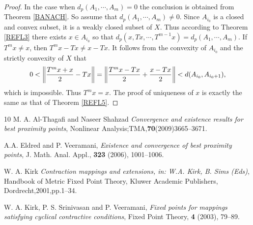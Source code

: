 \documentclass{amsart}
\theoremstyle{definition}
\theoremstyle{remark}
\begin{document}
\begin{proof}In the case when $d_p(A_1,\cdots,A_m)=0$ the conclusion is obtained from Theorem \ref{BANACH}. So assume that $d_p(A_1,\cdots,A_m)\neq0$. Since $A_{i_0}$ is a closed and convex subset, it is a weakly closed subset of $X$. Thus according to Theorem \ref{REFL3} there exists $x\in A_{i_0}$ so that $d_p(x,Tx,\cdots,T^{m-1}x)=d_p(A_1,\cdots,A_m)$. If $T^mx\neq x$, then $T^mx-Tx\neq x-Tx$. It follows from the convexity of $A_{i_0}$ and the strictly convexity of $X$ that $$0<\left\|{{{T^mx}+x}\over{2}}-Tx\right\|=\left\|{{{T^mx}-Tx}\over{2}}+{{x-Tx}\over{2}}\right\|<d(A_{i_0},A_{i_0+1}),$$ which is impossible. Thus $T^mx=x$. The proof of uniqueness of $x$ is exactly the same as that of Theorem \ref{REFL5}.
\end{proof}

\begin{thebibliography}{10}
 M. A. Al-Thagafi and Naseer Shahzad
 \textit{ Convergence and existence results for best proximity points},
Nonlinear Analysis;TMA,\textbf{70}(2009)3665--3671.


A.A. Eldred and P. Veeramani, \textit{ Existence and convergence of best proximity points}, J. Math. Anal. Appl., \textbf{323} (2006), 1001--1006.

W. A. Kirk \textit{ Contraction mappings and extensions, in: W.A. Kirk, B. Sims (Eds)}, Handbook of Metric Fixed Point Theory, Kluwer Academic Publishers, Dordrecht,2001,pp.1--34.

W. A. Kirk, P. S. Srinivasan and P. Veeramani, \textit{ Fixed points for mappings satisfying cyclical contractive conditions}, Fixed Point Theory, \textbf{4} (2003), 79--89.

\end{thebibliography}
\end{document}
